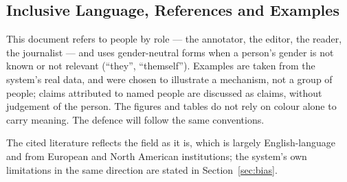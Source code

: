 
\subsection{Inclusive Language, References and Examples}

This document refers to people by role --- the annotator, the editor,
the reader, the journalist --- and uses gender-neutral forms when a
person's gender is not known or not relevant (``they'', ``themself'').
Examples are taken from the system's real data, and were chosen to
illustrate a mechanism, not a group of people; claims attributed to
named people are discussed as claims, without judgement of the person.
The figures and tables do not rely on colour alone to carry meaning.
The defence will follow the same conventions.

The cited literature reflects the field as it is, which is largely
English-language and from European and North American institutions;
the system's own limitations in the same direction are stated in
Section~\ref{sec:bias}.
